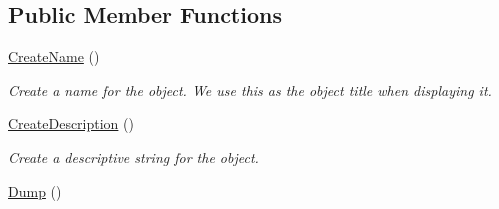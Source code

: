 \subsection*{Public Member Functions}
\begin{CompactItemize}
\item 
\hypertarget{class_object_a75e92322afb38f52e72df8f716bf1a3}{
\hyperlink{class_object_a75e92322afb38f52e72df8f716bf1a3}{CreateName} ()}
\label{class_object_a75e92322afb38f52e72df8f716bf1a3}

\begin{CompactList}\small\item\em Create a name for the object. We use this as the object title when displaying it. \item\end{CompactList}\item 
\hypertarget{class_object_370675399c0cd6572d3c6e6cdd26db89}{
\hyperlink{class_object_370675399c0cd6572d3c6e6cdd26db89}{CreateDescription} ()}
\label{class_object_370675399c0cd6572d3c6e6cdd26db89}

\begin{CompactList}\small\item\em Create a descriptive string for the object. \item\end{CompactList}\item 
\hypertarget{class_object_21b8ccf86460cc82f605dd7a838494a9}{
\hyperlink{class_object_21b8ccf86460cc82f605dd7a838494a9}{Dump} ()}
\label{class_object_21b8ccf86460cc82f605dd7a838494a9}


\end{CompactItemize}
